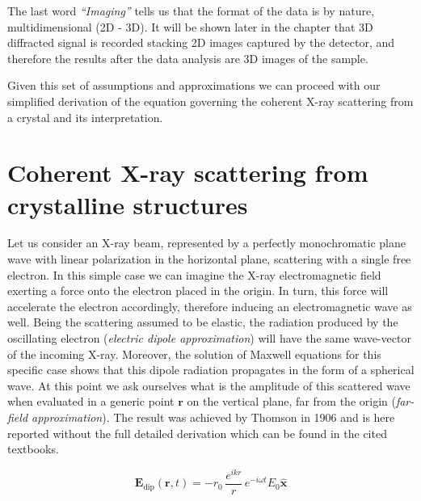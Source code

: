 The last word \textit{``Imaging''} tells us that the format of the data is by nature, multidimensional (2D - 3D). It 
will be shown later in the chapter that 3D diffracted signal is recorded stacking 2D images captured by the detector, 
and therefore the results after the data analysis are 3D images of the sample.

Given this set of assumptions and approximations we can proceed with our simplified derivation of the equation governing 
the coherent X-ray scattering from a crystal and its interpretation. 

\section{Coherent X-ray scattering from crystalline structures}

Let us consider an X-ray beam, represented by a perfectly monochromatic plane wave with linear polarization in the horizontal 
plane, scattering with a single free electron. In this simple case we can imagine the X-ray electromagnetic field exerting 
a force onto the electron placed in the origin. In turn, this force will accelerate the electron accordingly, therefore inducing  
an electromagnetic wave as well. Being the scattering assumed to be elastic, the radiation produced by the oscillating 
electron (\textit{electric dipole approximation}) will have the same wave-vector of the incoming X-ray. Moreover, the 
solution of Maxwell equations for this specific case 
shows that this dipole radiation propagates in the form of a spherical wave. At this point we ask ourselves what is the amplitude 
of this scattered wave when evaluated in a generic point $\mathbf r$ on the vertical plane, far from the origin (\textit{far-field approximation}). 
The result was achieved by Thomson in 1906 and is here reported without the full detailed derivation which can be found in the 
cited textbooks. 


\begin{equation}
    \mathbf{E}_{\text{dip}}(\mathbf{r},t) 
    = -r_0 \, \frac{e^{ikr}}{r} \, e^{-i \omega t} 
    E_0 \mathbf{\hat{x}}
    \label{eq:scattering_pointlike}
\end{equation}

